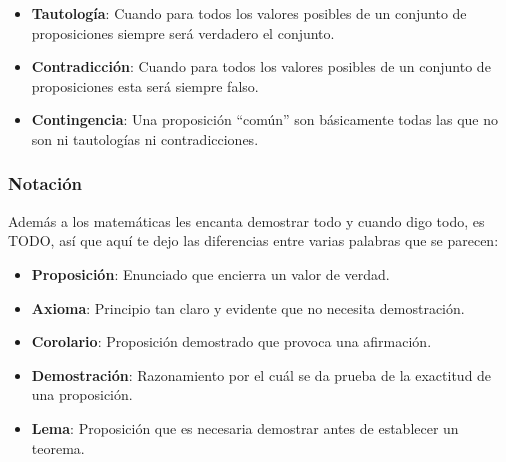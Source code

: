\documentclass[12pt]{report}                                    %
\begin{document}
                \begin{itemize}
                    \item \textbf{Tautología}: Cuando para todos los valores posibles de un conjunto
                            de proposiciones siempre será verdadero el conjunto.

                    \item \textbf{Contradicción}: Cuando para todos los valores posibles de un conjunto
                    de proposiciones esta será siempre falso.

                    \item \textbf{Contingencia}: Una proposición “común” son básicamente todas las que
                    no son ni tautologías ni contradicciones.
                \end{itemize}

            \subsubsection*{Notación}

                Además a los matemáticas les encanta demostrar todo y cuando digo todo, es TODO, así que
                aquí te dejo las diferencias entre varias palabras que se parecen:

                \begin{itemize}
                    \item \textbf{Proposición}: Enunciado que encierra un valor de verdad.

                    \item \textbf{Axioma}: Principio tan claro y evidente que no necesita demostración.

                    \item \textbf{Corolario}: Proposición demostrado que provoca una afirmación.

                    \item \textbf{Demostración}: Razonamiento por el cuál se da prueba de la
                        exactitud de una proposición.

                    \item \textbf{Lema}: Proposición que es necesaria demostrar antes de
                    establecer un teorema.

                \end{itemize}


    \clearpage
\end{document}
